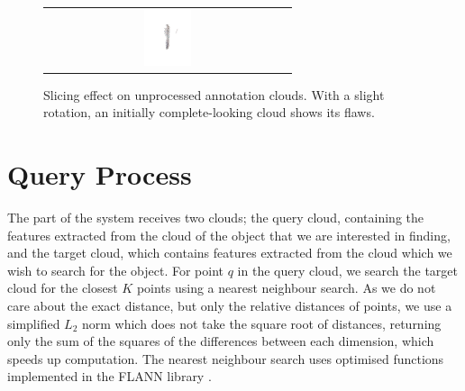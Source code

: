 \documentclass[11pt,a4paper]{kth-mag}
\begin{document}
\begin{figure}
{\begin{tabular}{c}
      \includegraphics[width=0.2\textwidth]{images/annotations/slices/hanger_jacket_side}
    \end{tabular}
  }
  \caption{Slicing effect on unprocessed annotation clouds. With a slight
    rotation, an initially complete-looking cloud shows its
    flaws.}
  \label{fig:slicing}
\end{figure}

\section{Query Process}

The part of the system receives two clouds; the query cloud, containing the
features extracted from the cloud of the object that we are interested in
finding, and the target cloud, which contains features extracted from the cloud
which we wish to search for the object. For point $q$ in the query cloud, we
search the target cloud for the closest $K$ points using a nearest neighbour
search. As we do not care about the exact distance, but only the relative
distances of points, we use a simplified $L_2$ norm which does not take the
square root of distances, returning only the sum of the squares of the
differences between each dimension, which speeds up computation. The nearest
neighbour search uses optimised functions implemented in the FLANN library
\cite{muja2009fast, muja2014scalable}.
\end{document}
